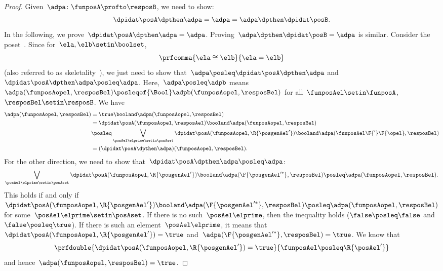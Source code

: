 \begin{proof}
    Given~$\adpa\colon \funposA\profto \resposB$, we need to show:
    \begin{equation}
        \dpidat\posA \dpthen \adpa = \adpa = \adpa \dpthen \dpidat\posB.
    \end{equation}
    In the following, we prove~$\dpidat\posA \dpthen \adpa = \adpa$.
    Proving~$\adpa\dpthen \dpidat\posB=\adpa$ is similar.
    Consider the poset~\Bool.
    Since for~$\ela,\elb\setin \boolset$,
    \begin{equation}
        \prfcomma{
            \ela\cong \elb
        }{
            \ela=\elb
        }
    \end{equation}
    (also referred to as skeletality~\cite{fong2019}), we just need to show that~$\adpa\posleq \dpidat\posA\dpthen \adpa$ and~$\dpidat\posA\dpthen \adpa\posleq \adpa$.
    Here,~$\adpa\posleq \adpb$ means~$\adpa(\funposAopel,\resposBel)\posleqof{\Bool}\adpb(\funposAopel,\resposBel)$ for all~$\funposAel\setin \funposA$,~$\resposBel\setin \resposB$.
    We have
    \begin{equation}
        \label{eq:dp_unit_1}
        \begin{aligned}
            \adpa(\funposAopel,\resposBel) & =\true \booland \adpa(\funposAopel,\resposBel) \\
                                           & = \dpidat\posA(\funposAopel,\resposAel) \booland \adpa(\funposAopel,\resposBel) \\
                                           & \posleq \bigvee_{\posAel\elprime \setin \posAset}\dpidat\posA(\funposAopel,\R{\posgenAel'})\booland \adpa(\funposAel\F{'}\F{\opel},\resposBel) \\
                                           & =(\dpidat\posA\dpthen \adpa)(\funposAopel,\resposBel).
        \end{aligned}
    \end{equation}
    For the other direction, we need to show that~$\dpidat\posA\dpthen \adpa\posleq \adpa$:
    \begin{equation}
        \label{eq:dp_unit_2}
        \bigvee_{\posAel\elprime\setin \posAset}\dpidat\posA(\funposAopel,\R{\posgenAel'})\booland \adpa(\F{\posgenAel'^*},\resposBel) \posleq \adpa(\funposAopel,\resposBel).
    \end{equation}
    This holds if and only if~$\dpidat\posA(\funposAopel,\R{\posgenAel'})\booland \adpa(\F{\posgenAel'^*},\resposBel) \posleq \adpa(\funposAopel,\resposBel)$ for some~$\posAel\elprime\setin \posAset$.
    If there is no such~$\posAel\elprime$, then the inequality holds ($\false \posleq \false$ and~$\false \posleq \true$).
    If there is such an element~$\posAel\elprime$, it means that~$\dpidat\posA(\funposAopel,\R{\posgenAel'})=\true$ and~$\adpa(\F{\posgenAel'^*},\resposBel)=\true$.
    We know that
    \begin{equation}
        \prfdouble{
            \dpidat\posA(\funposAopel,\R{\posgenAel'})=\true
        }{
            \funposAel \posleq \R{\posAel'}
        }
    \end{equation}
    and hence~$\adpa(\funposAopel,\resposBel)=\true$.
\end{proof}
